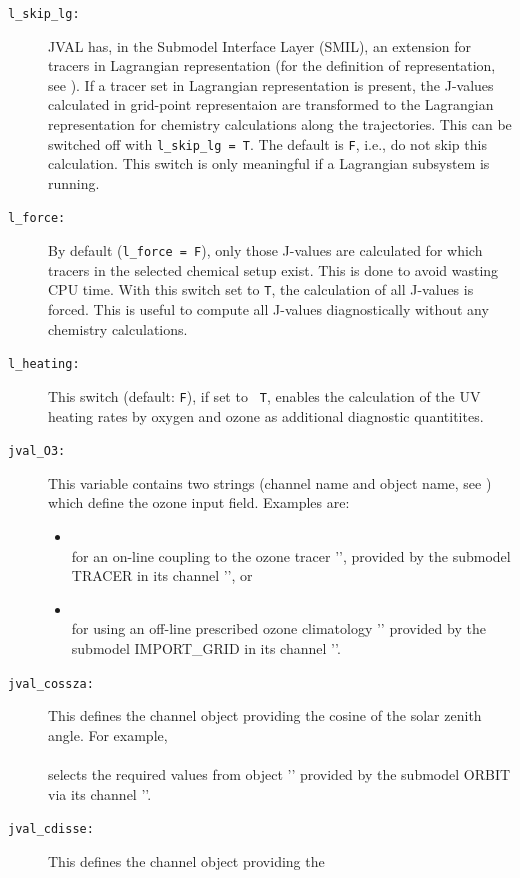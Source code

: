 \documentclass[a4paper,twoside]{article}
\begin{document}
\begin{description}
\item[\tt l\_skip\_lg:] JVAL has, in the Submodel Interface Layer
  (SMIL), an extension for tracers in Lagrangian representation (for the
  definition of representation, see \citet{2400}). If a tracer set
  \citep{2097} in Lagrangian representation is present, the J-values
  calculated in grid-point representaion are transformed to the
  Lagrangian representation for chemistry calculations along the
  trajectories. This can be switched off with {\tt l\_skip\_lg = T}. The
  default is {\tt F}, i.e., do not skip this calculation. This switch is
  only meaningful if a Lagrangian subsystem is running.
\item[\tt l\_force:] By default ({\tt l\_force = F}), only those
  J-values are calculated for which tracers in the selected chemical
  setup exist. This is done to avoid wasting CPU time. With this switch
  set to {\tt T}, the calculation of all J-values is forced. This is
  useful to compute all J-values diagnostically without any chemistry
  calculations.
\item[\tt l\_heating:] This switch (default: {\tt F}), if set to {\tt
    T}, enables the calculation of the UV heating rates by oxygen and
  ozone as additional diagnostic quantitites.
\item[\tt jval\_O3:] This variable contains two strings (channel name
  and object name, see \citet{2400}) which define the ozone input field.
  Examples are:
  \begin{itemize}
  \item {}\\
    for an on-line coupling to the ozone tracer '', provided by
    the submodel TRACER in its channel '', or
  \item {}\\
    for using an off-line prescribed ozone climatology ''
    provided by the submodel IMPORT\_GRID in its channel
    ''.
  \end{itemize}
\item[\tt jval\_cossza:] This defines the channel object providing the
  cosine of the solar zenith angle. For example,\\
  \\
  selects the required values from object '' provided by
  the submodel ORBIT via its channel ''.
\item[\tt jval\_cdisse:] This defines the channel object providing the

\end{description}
\end{document}
